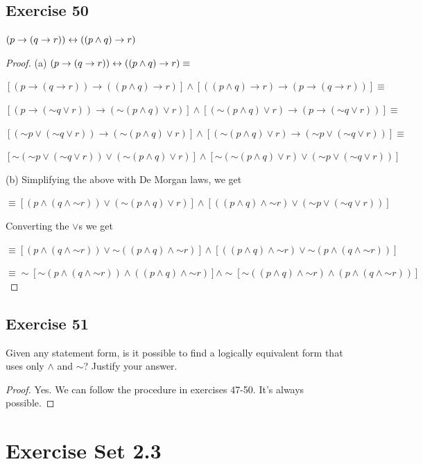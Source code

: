 \documentclass[14pt]{extarticle}
\begin{document}
\subsection{Exercise 50} $(p \to (q \to r)) \leftrightarrow ((p \wedge q) \to r)$
\begin{proof} (a) $(p \to (q \to r)) \leftrightarrow ((p \wedge q) \to r) \equiv $

$[(p \to (q \to r)) \to ((p \wedge q) \to r)] \wedge [((p \wedge q) \to r) \to
(p \to (q \to r))] \equiv$

$[(p \to ({\sim q} \vee r)) \to ({\sim (p \wedge q)} \vee r)] \wedge [({\sim (p
\wedge q)} \vee r) \to (p \to ({\sim q} \vee r))] \equiv$

$[({\sim p} \vee ({\sim q} \vee r)) \to ({\sim (p \wedge q)} \vee r)] \wedge
[({\sim (p \wedge q)} \vee r) \to ({\sim p} \vee ({\sim q} \vee r))] \equiv$

$[{\sim ({\sim p} \vee ({\sim q} \vee r))} \vee ({\sim (p \wedge q)} \vee r)]
\wedge [{\sim ({\sim (p \wedge q)} \vee r)} \vee ({\sim p} \vee ({\sim q} \vee
r))]$

(b) Simplifying the above with De Morgan laws, we get

$\equiv [(p \wedge (q \wedge {\sim r})) \vee ({\sim (p \wedge q)} \vee r)]
\wedge [((p \wedge q) \wedge {\sim r}) \vee ({\sim p} \vee ({\sim q} \vee r))]$

Converting the $\vee$s we get

$\equiv [(p \wedge (q \wedge {\sim r})) \vee {\sim((p \wedge q) \wedge {\sim
r})}] \wedge [((p \wedge q) \wedge {\sim r}) \vee {\sim(p \wedge (q \wedge {\sim
r}))}]$

$\equiv \sim[{\sim (p \wedge (q \wedge {\sim r}))} \wedge ((p \wedge q) \wedge
{\sim r})] \wedge \sim[{\sim ((p \wedge q) \wedge {\sim r})} \wedge (p \wedge (q
\wedge {\sim r}))]$ \end{proof}

\subsection{Exercise 51} Given any statement form, is it possible to find a
logically equivalent form that uses only $\wedge$ and $\sim$? Justify your
answer.

\begin{proof} Yes. We can follow the procedure in exercises 47-50. It's always
possible. \end{proof}

\section{Exercise Set 2.3}
\end{document}
